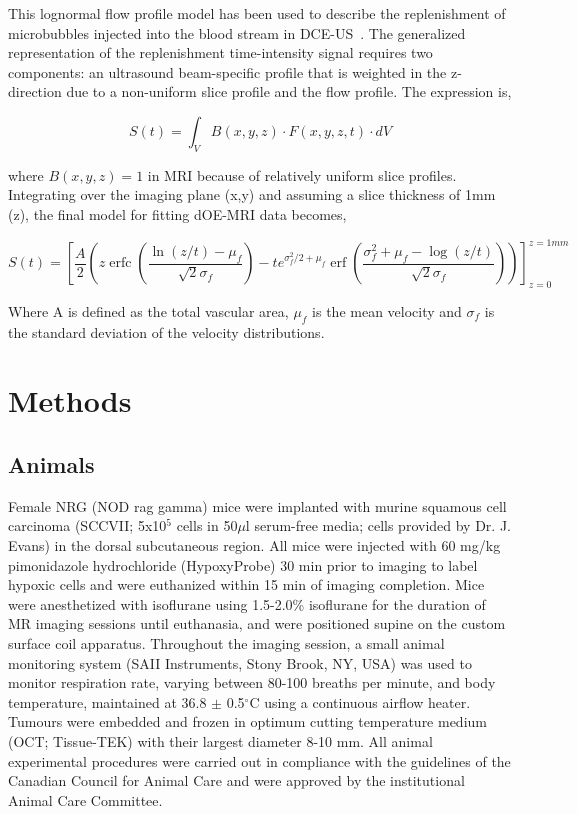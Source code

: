 This lognormal flow profile model has been used to describe the replenishment of microbubbles injected into the blood stream in \ac{DCE-US}~\cite{Hudson:2009jv}.
The generalized representation of the replenishment time-intensity signal requires two components: an ultrasound beam-specific profile that is weighted in the z-direction due to a non-uniform slice profile and the flow profile. 
The expression is,

\begin{equation}
S(t) = \int_{V} B(x,y,z) \cdot F(x,y,z,t) \cdot dV
\end{equation}

where $B(x,y,z) = 1$ in MRI because of relatively uniform slice profiles. 
Integrating over the imaging plane (x,y) and assuming a slice thickness of 1mm (z), the final model for fitting \ac{dOE-MRI} data becomes,

\begin{equation}
S(t)= \left[\frac{A}{2}\left(z \operatorname{erfc}\left(\frac{\ln \left(z/t\right)-\mu_f}{\sqrt{2} \sigma_f}\right)-t e^{\sigma_f^{2} / 2+\mu_f} \operatorname{erf}\left(\frac{\sigma_f^{2}+\mu_f-\log \left(z/t\right)}{\sqrt{2} \sigma_f}\right)\right)\right]_{z=0}^{z=1mm}
\label{lognormalFitEquation}
\end{equation}

Where A is defined as the total vascular area, $\mu_f$ is the mean velocity and $\sigma_f$ is the standard deviation of the velocity distributions. 

\section{Methods}
\subsection{Animals}
Female NRG (NOD rag gamma) mice were implanted with murine squamous cell carcinoma (SCCVII; 5x10$^5$ cells in 50$\mu$l serum-free media; cells provided by Dr. J. Evans) in the dorsal subcutaneous region.
All mice were injected with 60 mg/kg pimonidazole hydrochloride (HypoxyProbe) 30 min prior to imaging to label hypoxic cells and were euthanized within 15 min of imaging completion.
Mice were anesthetized with isoflurane using 1.5-2.0\% isoflurane for the duration of MR imaging sessions until euthanasia, and were positioned supine on the custom surface coil apparatus.
Throughout the imaging session, a small animal monitoring system (SAII Instruments, Stony Brook, NY, USA) was used to monitor respiration rate, varying between 80-100 breaths per minute, and body temperature, maintained at 36.8 $\pm$ 0.5$^\circ$C using a continuous airflow heater. 
Tumours were embedded and frozen in optimum cutting temperature medium (OCT; Tissue-TEK) with their largest diameter 8-10 mm.
All animal experimental procedures were carried out in compliance with the guidelines of the Canadian Council for Animal Care and were approved by the institutional Animal Care Committee.

